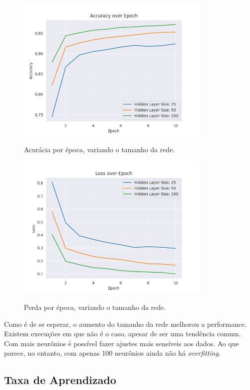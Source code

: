 \documentclass[a4paper]{article}
\begin{document}
\begin{figure}[H]
  \begin{center}
  {\includegraphics[height=7cm]{./images/Accuracy_over_Epoch_var_Hidden.png}}
  \end{center}
  \caption{Acurácia por época, variando o tamanho da rede. \label{fig:aeh}}
\end{figure}

\begin{figure}[H]
  \begin{center}
  {\includegraphics[height=7cm]{./images/Loss_over_Epoch_var_Hidden.png}}
  \end{center}
  \caption{Perda por época, variando o tamanho da rede. \label{fig:leh}}
\end{figure}

Como é de se esperar, o aumento do tamanho da rede melhorou a performance. Existem execuções em que não é o caso, apesar de ser uma tendência comum. Com mais neurônios é possível fazer ajustes mais sensíveis aos dados. Ao que parece, no entanto, com apenas 100 neurônios ainda não há \textit{overfitting}.

\subsection{Taxa de Aprendizado}%
\label{sub:Taxa de Aprendizado}
\end{document}
